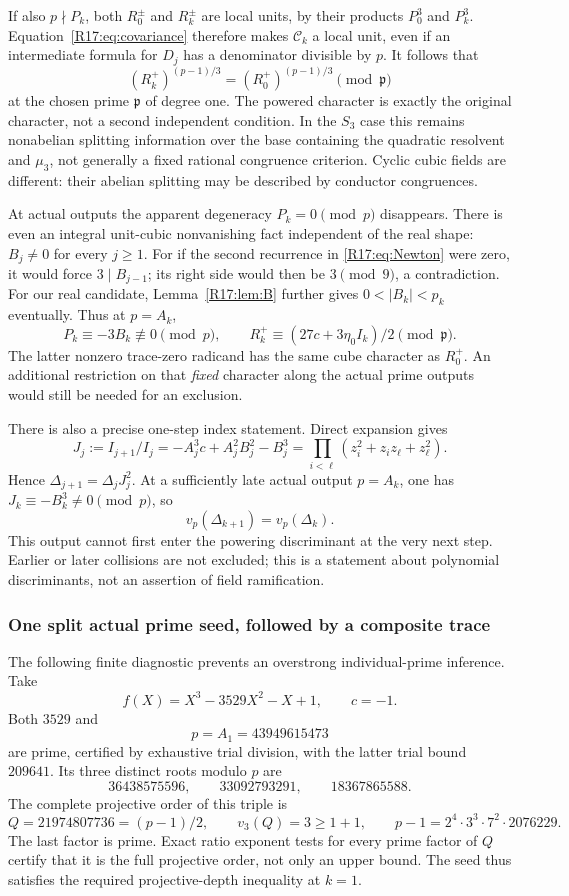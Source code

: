 \documentclass[11pt,a4paper]{article}
\theoremstyle{definition}\newtheorem{definition}[theorem]{Definition}
\theoremstyle{remark}\newtheorem{remark}[theorem]{Remark}
\begin{document}
If also $p\nmid P_k$, both $R_0^\pm$ and $R_k^\pm$ are local units,
by their products $P_0^3$ and $P_k^3$. Equation~\eqref{R17:eq:covariance}
therefore makes $\mathcal C_k$ a local unit, even if an intermediate
formula for $D_j$ has a denominator divisible by $p$. It follows that
\[
 (R_k^+)^{(p-1)/3}=(R_0^+)^{(p-1)/3}\pmod{\mathfrak p}
\]
at the chosen prime $\mathfrak p$ of degree one. The powered character
is exactly the original character, not a second independent condition.
In the $S_3$ case this remains nonabelian splitting information over the
base containing the quadratic resolvent and $\mu_3$, not generally a
fixed rational congruence criterion. Cyclic cubic fields are different:
their abelian splitting may be described by conductor congruences.

At actual outputs the apparent degeneracy $P_k=0\pmod p$ disappears.
There is even an integral unit-cubic nonvanishing fact independent of the
real shape: $B_j\ne0$ for every $j\ge1$. For if the second recurrence
in \eqref{R17:eq:Newton} were zero, it would force $3\mid B_{j-1}$;
its right side would then be $3\pmod9$, a contradiction.
For our real candidate, Lemma~\ref{R17:lem:B} further gives
$0<|B_k|<p_k$ eventually. Thus at $p=A_k$,
\[
 P_k\equiv-3B_k\not\equiv0\pmod p,
 \qquad R_k^+\equiv(27c+3\eta_0I_k)/2\pmod{\mathfrak p}.
\]
The latter nonzero trace-zero radicand has the same cube character as
$R_0^+$. An additional restriction on that \emph{fixed} character along
the actual prime outputs would still be needed for an exclusion.

There is also a precise one-step index statement. Direct expansion gives
\[
 J_j:=I_{j+1}/I_j=-A_j^3c+A_j^2B_j^2-B_j^3
 =\prod_{i<\ell}(z_i^2+z_iz_\ell+z_\ell^2).
\]
Hence $\Delta_{j+1}=\Delta_jJ_j^2$. At a sufficiently late actual
output $p=A_k$, one has $J_k\equiv-B_k^3\ne0\pmod p$, so
\[
 v_p(\Delta_{k+1})=v_p(\Delta_k).
\]
This output cannot first enter the powering discriminant at the very next
step. Earlier or later collisions are not excluded; this is a statement
about polynomial discriminants, not an assertion of field ramification.

\subsubsection{One split actual prime seed, followed by a composite trace}

The following finite diagnostic prevents an overstrong individual-prime
inference. Take
\[
 f(X)=X^3-3529X^2-X+1,\qquad c=-1.
\]
Both $3529$ and
\[
 p=A_1=43949615473
\]
are prime, certified by exhaustive trial division, with the latter trial
bound $209641$. Its three distinct roots modulo $p$ are
\[
 36438575596,\qquad33092793291,\qquad18367865588.
\]
The complete projective order of this triple is
\[
 Q=21974807736=(p-1)/2,\qquad v_3(Q)=3\ge1+1,
 \qquad p-1=2^4\cdot3^3\cdot7^2\cdot2076229.
\]
The last factor is prime. Exact ratio exponent tests for every prime
factor of $Q$ certify that it is the full projective order, not only an
upper bound. The seed thus satisfies the required projective-depth
inequality at $k=1$.
\end{document}
